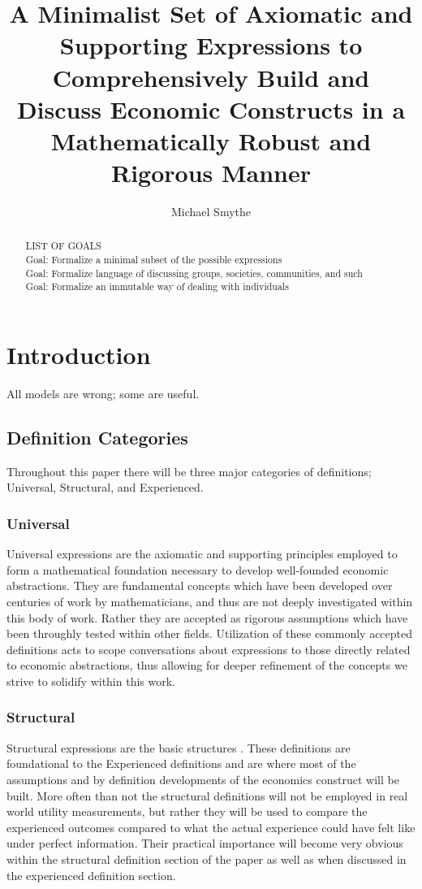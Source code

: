 \documentclass[]{article}
\title{A Minimalist Set of Axiomatic and Supporting Expressions to Comprehensively Build and Discuss Economic Constructs in a Mathematically Robust and Rigorous Manner}
\author{Michael Smythe}
\begin{document}
\maketitle

\begin{abstract}
LIST OF GOALS
\\Goal: Formalize a minimal subset of the possible expressions
\\Goal: Formalize language of discussing groups, societies, communities, and such
\\Goal: Formalize an immutable way of dealing with individuals
\end{abstract}
\section*{Introduction}
All models are wrong; some are useful. 
\subsection*{Definition Categories}
Throughout this paper there will be three major categories of definitions; Universal, Structural, and Experienced.
%
\subsubsection*{Universal}
Universal expressions are the axiomatic and supporting principles employed to form a mathematical foundation necessary to develop well-founded economic abstractions. They are fundamental concepts which have been developed over centuries of work by mathematicians, and thus are not deeply investigated within this body of work. Rather they are accepted as rigorous assumptions which have been throughly tested within other fields. Utilization of these commonly accepted definitions acts to scope conversations about expressions to those directly related to economic abstractions, thus allowing for deeper refinement of the concepts we strive to solidify within this work.  
%
\subsubsection*{Structural}
Structural expressions are the basic structures . These definitions are foundational to the Experienced definitions and are where most of the assumptions and by definition developments of the economics construct will be built. More often than not the structural definitions will not be employed in real world utility measurements, but rather they will be used to compare the experienced outcomes compared to what the actual experience could have felt like under perfect information. Their practical importance will become very obvious within the structural definition section of the paper as well as when discussed in the experienced definition section. 
%
\end{document}
